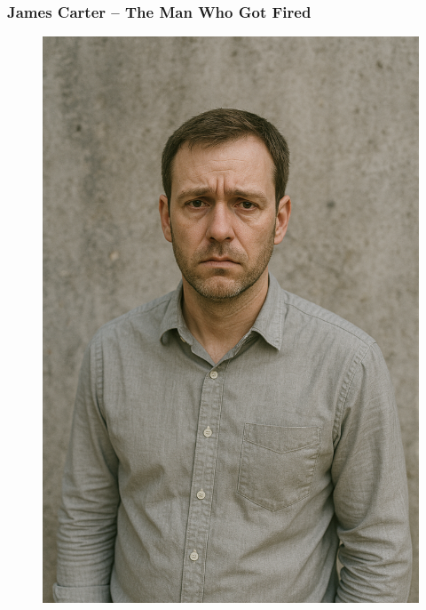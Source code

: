 \documentclass[a4paper,12pt]{article}
\begin{document}
\subsubsection{James Carter – The Man Who Got Fired}
\begin{figure}[H]
    \centering
    \includegraphics[scale=0.1]{james.png}
\end{figure}
\end{document}
